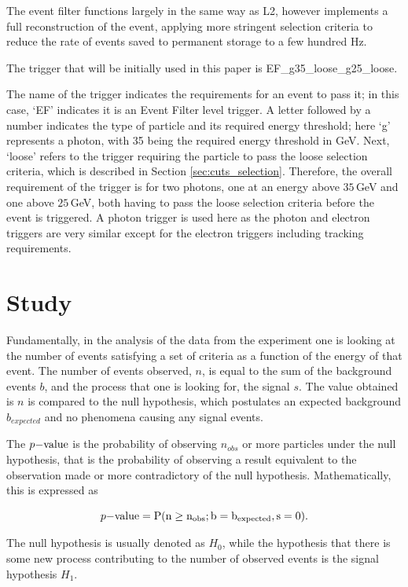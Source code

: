 \documentclass{article}
\begin{document}
The event filter functions largely in the same way as L2, however implements a full reconstruction of the event, applying more stringent selection criteria to reduce the rate of events saved to permanent storage to a few hundred Hz.

The trigger that will be initially used in this paper is  EF\_g35\_loose\_g25\_loose.

The name of the trigger indicates the requirements for an event to pass it; in this case, `EF' indicates it is an Event Filter level trigger. A letter followed by a number indicates the type of particle and its required energy threshold; here `g' represents a photon, with 35  being the required energy threshold in GeV. Next, `loose' refers to the trigger requiring the particle to pass the loose selection criteria, which is described in Section \ref{sec:cuts_selection}. Therefore, the overall requirement of the trigger is for two photons, one at an energy above $35\,$GeV and one above $25\,$GeV, both having to pass the loose selection criteria before the event is triggered. A photon trigger is used here as the photon and electron triggers are very similar except for the electron triggers including tracking requirements.

\section{Study}
\label{sec:Study}

Fundamentally, in the analysis of the data from the experiment one is looking at the number of events satisfying a set of criteria as a function of the energy of that event. The number of events observed, $n$, is equal to the sum of the background events $b$, and the process that one is looking for, the signal $s$. The value obtained is $n$ is compared to the null hypothesis, which postulates an expected background $b_{expected}$ and no phenomena causing any signal events.

The $p\rm{-value}$ is the probability of observing $n_{obs}$ or more particles under the null hypothesis, that is the probability of observing a result equivalent to the observation made or more contradictory of the null hypothesis. Mathematically, this is expressed as

\begin{equation}
p\rm{-value} = P(n	\geq n_{obs}; b = b_{expected}, s=0).
\end{equation}

The null hypothesis is usually denoted as $H_0$, while the hypothesis that there is some new process contributing to the number of observed events is the signal hypothesis $H_1$.
\end{document}
